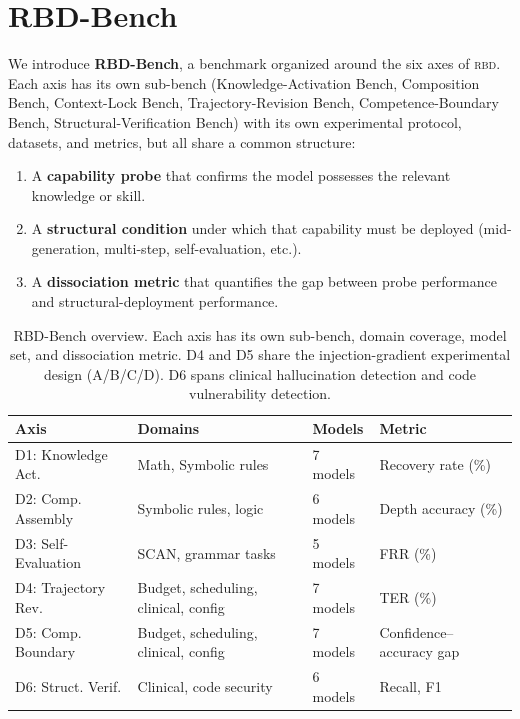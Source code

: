 \documentclass[11pt]{article}
\newcommand{\rbd}{\textsc{rbd}}
\newcommand{\tighttable}{\setlength{\tabcolsep}{4pt}\renewcommand{\arraystretch}{1.05}}
\begin{document}
\section{RBD-Bench}
\label{sec:bench}

We introduce \textbf{RBD-Bench}, a benchmark organized around the six
axes of \rbd{}. Each axis has its own sub-bench (Knowledge-Activation
Bench, Composition Bench, Context-Lock Bench, Trajectory-Revision Bench,
Competence-Boundary Bench, Structural-Verification Bench) with its own
experimental protocol, datasets, and metrics, but all share a common
structure:

\begin{enumerate}[noitemsep, topsep=2pt]
\item A \textbf{capability probe} that confirms the model possesses the
relevant knowledge or skill.
\item A \textbf{structural condition} under which that capability must
be deployed (mid-generation, multi-step, self-evaluation, etc.).
\item A \textbf{dissociation metric} that quantifies the gap between
probe performance and structural-deployment performance.
\end{enumerate}

\begin{table}[H]
\centering\small\tighttable
\begin{tabular}{p{2.2cm}p{2.0cm}p{1.8cm}p{2.8cm}}
\toprule
\textbf{Axis} & \textbf{Domains} & \textbf{Models} & \textbf{Metric} \\
\midrule
D1: Knowledge Act. & Math, Symbolic rules & 7 models & Recovery rate (\%) \\
D2: Comp. Assembly & Symbolic rules, logic & 6 models & Depth accuracy (\%) \\
D3: Self-Evaluation & SCAN, grammar tasks & 5 models & FRR (\%) \\
D4: Trajectory Rev. & Budget, scheduling, clinical, config & 7 models & TER (\%) \\
D5: Comp. Boundary & Budget, scheduling, clinical, config & 7 models & Confidence--accuracy gap \\
D6: Struct. Verif. & Clinical, code security & 6 models & Recall, F1 \\
\bottomrule
\end{tabular}
\caption{RBD-Bench overview. Each axis has its own sub-bench, domain
coverage, model set, and dissociation metric. D4 and D5 share the
injection-gradient experimental design (A/B/C/D). D6 spans clinical
hallucination detection and code vulnerability detection.}
\label{tab:bench}
\end{table}
\end{document}
